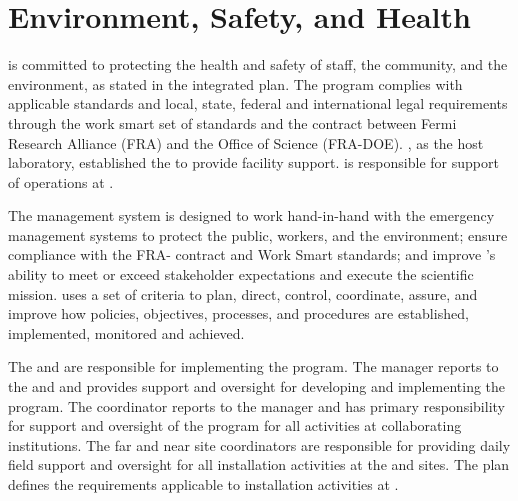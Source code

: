 \section{Environment, Safety, and Health}
\label{sec:es-tc-eshq}

 is committed to protecting the health and
safety of staff, the community, and the environment, as stated in the
 integrated  plan.  
The   program complies with applicable
standards and local, state, federal and international legal
requirements through the \fnal work smart set of standards and the
contract between Fermi Research Alliance (FRA) and the 
Office of Science (FRA-DOE). \fnal, as the host laboratory,
established the  to provide facility support.
 is responsible for support of 
operations at .

The   management system is
designed to work hand-in-hand with the  emergency
management systems to protect the public, workers, and the environment;
ensure compliance with the FRA- contract and \fnal Work Smart
standards; and improve  's ability to meet or
exceed stakeholder expectations and execute the
scientific mission.   uses a set of criteria to plan, direct,
control, coordinate, assure, and improve how  policies,
objectives, processes, and procedures are established, implemented,
monitored and achieved.

The  and  are responsible for
implementing the   program.  The
  manager reports  to the
 and  and provides
 support and oversight for developing and implementing the
  program. The  
coordinator reports to the  
manager and has primary responsibility for  support and
oversight of the   program for all activities
at collaborating institutions. %
The far and near site  coordinators are responsible for providing 
daily field support and
oversight for all installation activities at the 
and  sites. 
The   plan defines the 
requirements applicable to installation activities at . 

